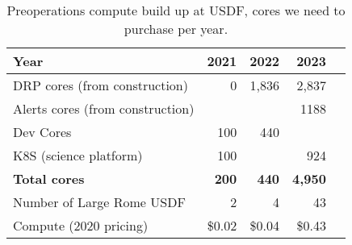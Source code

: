 \tiny \begin{longtable} { |p{}  |r  |r  |r  |r |} 
\caption{Preoperations compute build up at USDF, cores we need to purchase per year. \label{tab:preCompute}}\\ 
\hline 
\textbf{Year}&\textbf{2021}&\textbf{2022}&\textbf{2023} \\ \hline
{DRP cores (from construction)}&{0}&{1,836}&{2,837} \\ \hline
{Alerts cores (from construction)}&{}&{}&{1188} \\ \hline
{Dev Cores}&{100}&{440}&{} \\ \hline
{K8S (science platform)}&{100}&{}&{924} \\ \hline
\textbf{Total cores}&\textbf{200}&\textbf{440}&\textbf{4,950} \\ \hline
{Number of Large Rome USDF}&{2}&{4}&{43} \\ \hline
{Compute (2020 pricing)}&{\$0.02}&{\$0.04}&{\$0.43} \\ \hline
\end{longtable} \normalsize
